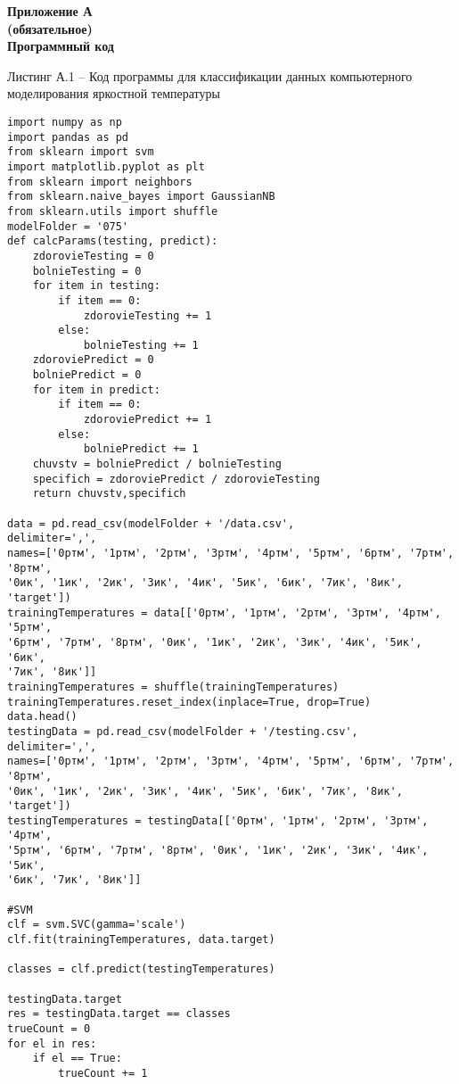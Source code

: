 \newpage
{} 
\begin{center} 
    \textbf{Приложение А}
    \\
    \textbf{(обязательное)}
    \\
    \textbf{Программный код}
\end{center} 
\vspace{8mm}
\par
Листинг А.1 -- Код программы для классификации данных компьютерного моделирования яркостной температуры
\vspace{8mm}
\large
\begin{verbatim}
import numpy as np
import pandas as pd
from sklearn import svm
import matplotlib.pyplot as plt
from sklearn import neighbors
from sklearn.naive_bayes import GaussianNB
from sklearn.utils import shuffle
modelFolder = '075'
def calcParams(testing, predict):
    zdorovieTesting = 0
    bolnieTesting = 0
    for item in testing:    
        if item == 0:
            zdorovieTesting += 1
        else:
            bolnieTesting += 1
    zdoroviePredict = 0
    bolniePredict = 0
    for item in predict:    
        if item == 0:
            zdoroviePredict += 1
        else:
            bolniePredict += 1	
	chuvstv = bolniePredict / bolnieTesting
	specifich = zdoroviePredict / zdorovieTesting
	return chuvstv,specifich
	
data = pd.read_csv(modelFolder + '/data.csv', 
delimiter=',', 
names=['0ртм', '1ртм', '2ртм', '3ртм', '4ртм', '5ртм', '6ртм', '7ртм', '8ртм', 
'0ик', '1ик', '2ик', '3ик', '4ик', '5ик', '6ик', '7ик', '8ик', 'target'])
trainingTemperatures = data[['0ртм', '1ртм', '2ртм', '3ртм', '4ртм', '5ртм', 
'6ртм', '7ртм', '8ртм', '0ик', '1ик', '2ик', '3ик', '4ик', '5ик', '6ик',
'7ик', '8ик']]
trainingTemperatures = shuffle(trainingTemperatures)
trainingTemperatures.reset_index(inplace=True, drop=True)
data.head()
testingData = pd.read_csv(modelFolder + '/testing.csv', 
delimiter=',', 
names=['0ртм', '1ртм', '2ртм', '3ртм', '4ртм', '5ртм', '6ртм', '7ртм', '8ртм', 
'0ик', '1ик', '2ик', '3ик', '4ик', '5ик', '6ик', '7ик', '8ик', 'target'])
testingTemperatures = testingData[['0ртм', '1ртм', '2ртм', '3ртм', '4ртм',
'5ртм', '6ртм', '7ртм', '8ртм', '0ик', '1ик', '2ик', '3ик', '4ик', '5ик',
'6ик', '7ик', '8ик']]

#SVM
clf = svm.SVC(gamma='scale')
clf.fit(trainingTemperatures, data.target)

classes = clf.predict(testingTemperatures)

testingData.target
res = testingData.target == classes
trueCount = 0
for el in res:
	if el == True:
		trueCount += 1


\end{verbatim}
